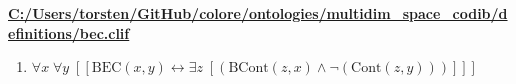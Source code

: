 \documentclass{article}
\begin{document}
\textbf{\url{C:/Users/torsten/GitHub/colore/ontologies/multidim\_space\_codib/definitions/bec.clif}}

\begin{enumerate}
\item $\forall x\; \forall y\;  \left[ \left[ \textrm{BEC}(x,y) \leftrightarrow \exists z\;  \left[ \left(\textrm{BCont}(z,x) \land \neg \left(\textrm{Cont}(z,y)\right)\right) \right] \right] \right]$
\end{enumerate}
\end{document}
